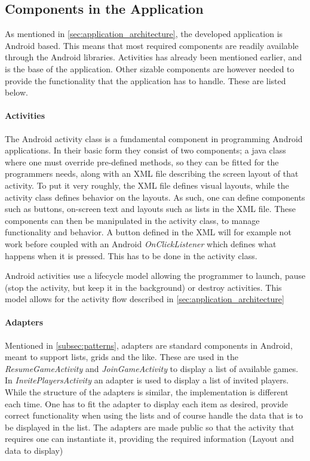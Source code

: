 \subsection{Components in the Application} \label{subsec:components}
As mentioned in \ref{sec:application_architecture}, the developed application is Android based. This means that most required components are readily available through the Android libraries. Activities has already been mentioned earlier, and is the base of the application. Other sizable components are however needed to provide the functionality that the application has to handle. These are listed below.

\paragraph{Activities}
The Android activity class is a fundamental component in programming Android applications\cite{android-activity}. In their basic form they consist of two components; a java class where one must override pre-defined methods, so they can be fitted for the programmers needs, along with an XML file describing the screen layout of that activity. To put it very roughly, the XML file defines visual layouts, while the activity class defines behavior on the layouts. As such, one can define components such as buttons, on-screen text and layouts such as lists in the XML file. These components can then be manipulated in the activity class, to manage functionality and behavior. A button defined in the XML will for example not work before coupled with an Android \textit{OnClickListener} which defines what happens when it is pressed. This has to be done in the activity class.

Android activities use a lifecycle model allowing the programmer to launch, pause (stop the activity, but keep it in the background) or destroy activities. This model allows for the activity flow described in \ref{sec:application_architecture}

\paragraph{Adapters}
Mentioned in \ref{subsec:patterns}, adapters are standard components in Android, meant to support lists, grids and the like. These are used in the \textit{ResumeGameActivity} and \textit{JoinGameActivity} to display a list of available games. In \textit{InvitePlayersActivity} an adapter is used to display a list of invited players. While the structure of the adapters is similar, the implementation is different each time. One has to fit the adapter to display each item as desired, provide correct functionality when using the lists and of course handle the data that is to be displayed in the list. The adapters are made public so that the activity that requires one can instantiate it, providing the required information (Layout and data to display)

